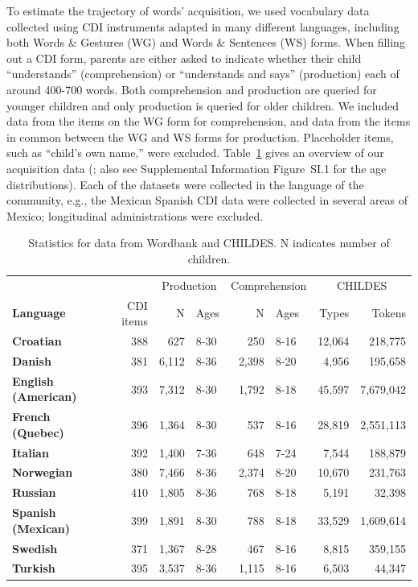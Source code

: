 \documentclass[manuscript]{stjour}
\begin{document}
To estimate the trajectory of words' acquisition, we used vocabulary
data collected using CDI instruments adapted in many different
languages, including both Words \& Gestures (WG) and Words \& Sentences
(WS) forms. When filling out a CDI form, parents are either asked to
indicate whether their child ``understands'' (comprehension) or
``understands and says'' (production) each of around 400-700 words. Both
comprehension and production are queried for younger children and only
production is queried for older children. We included data from the
items on the WG form for comprehension, and data from the items in
common between the WG and WS forms for production. Placeholder items,
such as ``child's own name,'' were excluded. Table~\ref{tab:langstats}
gives an overview of our acquisition data
(\citealp{kovacevic1996,bleses2008,boudreault2007,trudeau2011,caselli2012,caselli1995,simonsen2014,vershinina2011,yeliseyeva2009,fenson2003,eriksson2002,acarlar2008};
also see Supplemental Information Figure~SI.1 for the age distributions). Each
of the datasets were collected in the language of the community, e.g.,
the Mexican Spanish CDI data were collected in several areas of Mexico;
longitudinal administrations were excluded.

\begin{table}[t]

\caption{\label{tab:langstats}Statistics for data from Wordbank and CHILDES. N indicates number of children.}
\centering
\begin{tabular}{>{\bfseries}lrrlrlrr}
\toprule
\multicolumn{1}{c}{} & \multicolumn{1}{c}{} & \multicolumn{2}{c}{Production} & \multicolumn{2}{c}{Comprehension} & \multicolumn{2}{c}{CHILDES} \\
\cmidrule(l{3pt}r{3pt}){3-4} \cmidrule(l{3pt}r{3pt}){5-6} \cmidrule(l{3pt}r{3pt}){7-8}
Language & CDI items & N & Ages & N & Ages & Types & Tokens\\
\midrule
Croatian & 388 & 627 & 8-30 & 250 & 8-16 & 12,064 & 218,775\\
Danish & 381 & 6,112 & 8-36 & 2,398 & 8-20 & 4,956 & 195,658\\
English (American) & 393 & 7,312 & 8-30 & 1,792 & 8-18 & 45,597 & 7,679,042\\
French (Quebec) & 396 & 1,364 & 8-30 & 537 & 8-16 & 28,819 & 2,551,113\\
Italian & 392 & 1,400 & 7-36 & 648 & 7-24 & 7,544 & 188,879\\
Norwegian & 380 & 7,466 & 8-36 & 2,374 & 8-20 & 10,670 & 231,763\\
Russian & 410 & 1,805 & 8-36 & 768 & 8-18 & 5,191 & 32,398\\
Spanish (Mexican) & 399 & 1,891 & 8-30 & 788 & 8-18 & 33,529 & 1,609,614\\
Swedish & 371 & 1,367 & 8-28 & 467 & 8-16 & 8,815 & 359,155\\
Turkish & 395 & 3,537 & 8-36 & 1,115 & 8-16 & 6,503 & 44,347\\
\bottomrule
\end{tabular}
\end{table}
\end{document}
